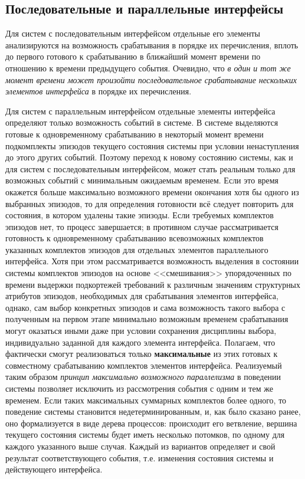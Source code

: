 \subsection{Последовательные и параллельные интерфейсы}

Для систем с последовательным интерфейсом отдельные его элементы анализируются на возможность срабатывания в порядке их перечисления, вплоть до первого готового к срабатыванию в ближайший момент времени по отношению к времени предыдущего события. 
Очевидно, что \textit{в один и тот же момент времени может произойти последовательное срабатывание нескольких элементов интерфейса} в порядке их перечисления.

Для систем с параллельным интерфейсом отдельные элементы интерфейса определяют только возможность событий в системе. 
В системе выделяются готовые к одновременному срабатыванию в некоторый момент времени подкомплекты эпизодов текущего состояния системы при условии ненаступления до этого других событий. 
Поэтому переход к новому состоянию системы, как и для систем с последовательным интерфейсом, может стать реальным только для возможных событий с минимальным ожидаемым временем. 
Если это время окажется больше максимально возможного времени окончания хотя бы одного из выбранных эпизодов, то для определения готовности всё следует повторить для состояния, в котором удалены такие эпизоды. 
Если требуемых комплектов эпизодов нет, то процесс завершается; в противном случае рассматривается готовность к одновременному срабатыванию всевозможных комплектов указанных комплектов эпизодов для отдельных элементов параллельного интерфейса. 
Хотя при этом рассматривается возможность выделения в состоянии системы комплектов эпизодов на основе <<смешивания>> упорядоченных по времени выдержки подкортежей требований к различным значениям структурных атрибутов эпизодов, необходимых для срабатывания элементов интерфейса, однако, сам выбор конкретных эпизодов и сама возможность такого выбора с полученным на первом этапе минимально возможным временем срабатывания могут оказаться иными даже при условии сохранения дисциплины выбора, индивидуально заданной для каждого элемента интерфейса. 
Полагаем, что фактически смогут реализоваться только \textbf{максимальные} из этих готовых к совместному срабатыванию комплектов элементов интерфейса. 
Реализуемый таким образом \textit{принцип максимально возможного параллелизма} в поведении системы позволяет исключить из рассмотрения события с одним и тем же временем. 
Если таких максимальных суммарных комплектов более одного, то поведение системы становится недетерминированным, и, как было сказано ранее, оно формализуется в виде дерева процессов: происходит его ветвление, вершина текущего состояния системы будет иметь несколько потомков, по одному для каждого указанного выше случая. 
Каждый из вариантов определяет и свой результат соответствующего события, т.е. изменения состояния системы и действующего интерфейса.

